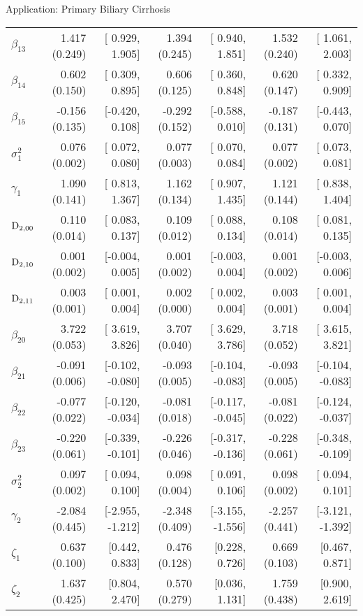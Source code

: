 \begin{chapter}{\label{cha:app-PBC}Application: Primary Biliary Cirrhosis}
\begin{table}[ht]
\begin{tabular}{lrrrrrr}
    $\beta_{13}$ &  1.417 (0.249) & [ 0.929, 1.905] &  1.394 (0.245) & [ 0.940, 1.851] &  1.532 (0.240) & [ 1.061, 2.003] \\ 
    $\beta_{14}$ &  0.602 (0.150) & [ 0.309, 0.895] &  0.606 (0.125) & [ 0.360, 0.848] &  0.620 (0.147) & [ 0.332, 0.909] \\ 
    $\beta_{15}$ & -0.156 (0.135) & [-0.420, 0.108] & -0.292 (0.152) & [-0.588, 0.010] & -0.187 (0.131) & [-0.443, 0.070] \\ 
    $\sigma^2_1$ &  0.076 (0.002) & [ 0.072, 0.080] &  0.077 (0.003) & [ 0.070, 0.084] &  0.077 (0.002) & [ 0.073, 0.081] \\ 
    $\gamma_1$ &  1.090 (0.141) & [ 0.813, 1.367] &  1.162 (0.134) & [ 0.907, 1.435] &  1.121 (0.144) & [ 0.838, 1.404] \\ 
    \hdashline
    $\mathrm{D}_{2,00}$ & 0.110 (0.014) & [ 0.083, 0.137] & 0.109 (0.012) & [ 0.088, 0.134] & 0.108 (0.014) & [ 0.081, 0.135] \\ 
    $\mathrm{D}_{2,10}$ & 0.001 (0.002) & [-0.004, 0.005] & 0.001 (0.002) & [-0.003, 0.004] & 0.001 (0.002) & [-0.003, 0.006] \\ 
    $\mathrm{D}_{2,11}$ & 0.003 (0.001) & [ 0.001, 0.004] & 0.002 (0.000) & [ 0.002, 0.004] & 0.003 (0.001) & [ 0.001, 0.004] \\ 
    $\beta_{20}$ &  3.722 (0.053) & [ 3.619,  3.826] &  3.707 (0.040) & [ 3.629,  3.786] &  3.718 (0.052) & [ 3.615,  3.821] \\ 
    $\beta_{21}$ & -0.091 (0.006) & [-0.102, -0.080] & -0.093 (0.005) & [-0.104, -0.083] & -0.093 (0.005) & [-0.104, -0.083] \\ 
    $\beta_{22}$ & -0.077 (0.022) & [-0.120, -0.034] & -0.081 (0.018) & [-0.117, -0.045] & -0.081 (0.022) & [-0.124, -0.037] \\ 
    $\beta_{23}$ & -0.220 (0.061) & [-0.339, -0.101] & -0.226 (0.046) & [-0.317, -0.136] & -0.228 (0.061) & [-0.348, -0.109] \\ 
    $\sigma^2_2$ &  0.097 (0.002) & [ 0.094,  0.100] &  0.098 (0.004) & [ 0.091,  0.106] &  0.098 (0.002) & [ 0.094,  0.101] \\ 
    $\gamma_2$ & -2.084 (0.445) & [-2.955, -1.212] & -2.348 (0.409) & [-3.155, -1.556] & -2.257 (0.441) & [-3.121, -1.392] \\  
    \hdashline
    $\zeta_1$ & 0.637 (0.100) & [0.442, 0.833] & 0.476 (0.128) & [0.228, 0.726] & 0.669 (0.103) & [0.467, 0.871] \\ 
    $\zeta_2$ & 1.637 (0.425) & [0.804, 2.470] & 0.570 (0.279) & [0.036, 1.131] & 1.759 (0.438) & [0.900, 2.619] \\ 

\end{tabular}
\end{table}
\end{chapter}

